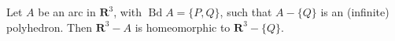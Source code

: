 Let $A$ be an arc in $\mathbf{R}^3$, with $\operatorname{Bd} A = \{P, Q\}$, such that $A - \{Q\}$ is an (infinite) polyhedron. Then $\mathbf{R}^3 - A$ is homeomorphic to $\mathbf{R}^3 - \{Q\}$.
